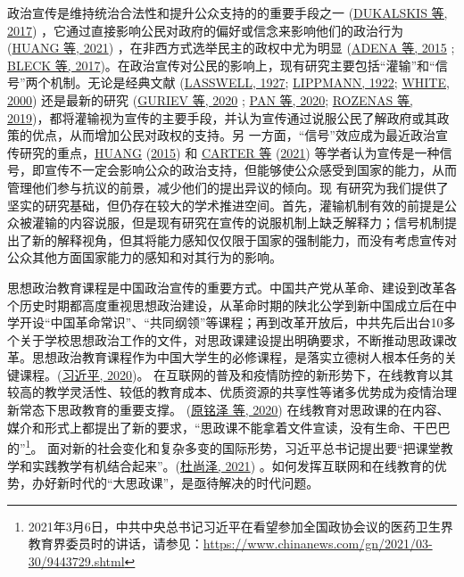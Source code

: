 \documentclass[
  12pt,
]{ctexart}
\begin{document}
政治宣传是维持统治合法性和提升公众支持的的重要手段之一 (\protect\hyperlink{ref-DukalskisGerschewski2017}{DUKALSKIS 等, 2017}) ，它通过直接影响公民对政府的偏好或信念来影响他们的政治行为 (\protect\hyperlink{ref-HuangCruz2021}{HUANG 等, 2021}) ，在非西方式选举民主的政权中尤为明显 (\protect\hyperlink{ref-AdenaEtAl2015}{ADENA 等, 2015} ; \protect\hyperlink{ref-BleckMichelitch2017}{BLECK 等, 2017})。在政治宣传对公民的影响上，现有研究主要包括``灌输''和``信号''两个机制。无论是经典文献 (\protect\hyperlink{ref-Lasswell1927}{LASSWELL, 1927}; \protect\hyperlink{ref-Lippmann1922}{LIPPMANN, 1922}; \protect\hyperlink{ref-White2000}{WHITE, 2000}) 还是最新的研究 (\protect\hyperlink{ref-GurievTreisman2020}{GURIEV 等, 2020} ; \protect\hyperlink{ref-PanEtAl2020}{PAN 等, 2020}; \protect\hyperlink{ref-RozenasStukal2019}{ROZENAS 等, 2019})，都将灌输视为宣传的主要手段，并认为宣传通过说服公民了解政府或其政策的优点，从而增加公民对政权的支持。另
一方面，``信号''效应成为最近政治宣传研究的重点，\protect\hyperlink{ref-Huang2015a}{HUANG} (\protect\hyperlink{ref-Huang2015a}{2015}) 和 \protect\hyperlink{ref-CarterCarter2021}{CARTER 等} (\protect\hyperlink{ref-CarterCarter2021}{2021}) 等学者认为宣传是一种信号，即宣传不一定会影响公众的政治支持，但能够使公众感受到国家的能力，从而管理他们参与抗议的前景，减少他们的提出异议的倾向。现
有研究为我们提供了坚实的研究基础，但仍存在较大的学术推进空间。首先，灌输机制有效的前提是公众被灌输的内容说服，但是现有研究在宣传的说服机制上缺乏解释力；信号机制提出了新的解释视角，但其将能力感知仅仅限于国家的强制能力，而没有考虑宣传对公众其他方面国家能力的感知和对其行为的影响。

思想政治教育课程是中国政治宣传的重要方式。中国共产党从革命、建设到改革各个历史时期都高度重视思想政治建设，从革命时期的陕北公学到新中国成立后在中学开设``中国革命常识''、``共同纲领''等课程；再到改革开放后，中共先后出台10多个关于学校思想政治工作的文件，对思政课建设提出明确要求，不断推动思政课改革。思想政治教育课程作为中国大学生的必修课程，是落实立德树人根本任务的关键课程。(\protect\hyperlink{ref-XiJinPing2020}{习近平, 2020})。 在互联网的普及和疫情防控的新形势下，在线教育以其较高的教学灵活性、较低的教育成本、优质资源的共享性等诸多优势成为疫情治理新常态下思政教育的重要支撑。 (\protect\hyperlink{ref-YuanMingZeEtAl2020a}{原铭泽 等, 2020}) 在线教育对思政课的在内容、媒介和形式上都提出了新的要求，``思政课不能拿着文件宣读，没有生命、干巴巴的''\footnote{2021年3月6日，中共中央总书记习近平在看望参加全国政协会议的医药卫生界教育界委员时的讲话，请参见：\url{https://www.chinanews.com/gn/2021/03-30/9443729.shtml}}。
面对新的社会变化和复杂多变的国际形势，习近平总书记提出要``把课堂教学和实践教学有机结合起来''。(\protect\hyperlink{ref-DuShangZe2021}{杜尚泽, 2021}) 。如何发挥互联网和在线教育的优势，办好新时代的``大思政课''，是亟待解决的时代问题。
\end{document}
